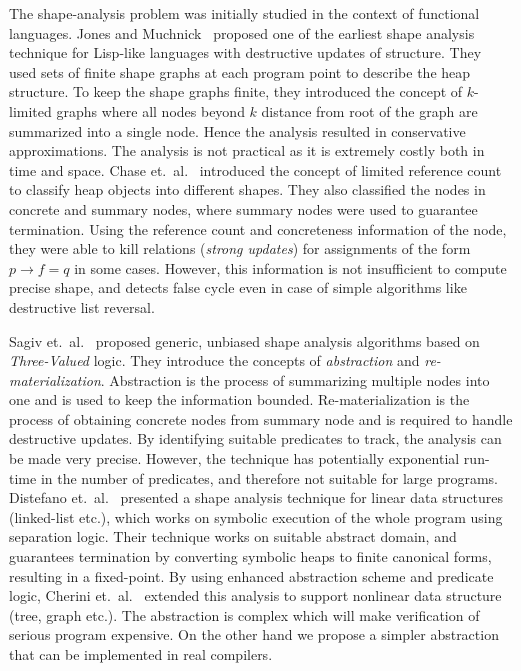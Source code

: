 \documentclass[letterpaper]{sig-alternate}
\newcommand{\p}{\ensuremath{p}}
\newcommand{\q}{\ensuremath{q}}
\begin{document}
The shape-analysis problem was initially studied in the
context of functional languages. Jones and
Muchnick~\cite{Jones79} proposed one of the earliest shape
analysis technique for Lisp-like languages with destructive
updates of structure. They used sets of finite shape graphs
at each program point to describe the heap structure. To
keep the shape graphs finite, they introduced the concept of
$k$-limited graphs where all nodes beyond $k$ distance from
root of the graph are summarized into a single node. Hence
the analysis resulted in conservative approximations. The
analysis is not practical as it is extremely costly both in
time and space.
%
Chase et.~al.~\cite{Chase90} introduced the concept of limited
reference count to classify heap objects into different
shapes. They also classified the nodes in concrete and
summary nodes, where summary nodes were used to guarantee
termination. Using the reference count and concreteness
information of the node, they were able to kill relations
({\em strong updates}) for assignments of the form $\p\rightarrow f = \q$
in some cases. However, this information is not
insufficient to compute precise shape, and detects false
cycle even in case of simple algorithms like destructive list
reversal.

Sagiv et.~al.~\cite{Sagiv96,Sagiv02toplas} proposed
generic, unbiased shape analysis algorithms based on {\em
  Three-Valued} logic. They introduce the concepts of {\em
  abstraction} and {\em re-materialization}. Abstraction is
the process of summarizing multiple nodes into one and is
used to keep the information bounded. Re-materialization is
the process of obtaining concrete nodes from summary node and
is required to handle destructive updates. By identifying
suitable predicates to track, the analysis can be made very
precise. However, the technique has potentially exponential
run-time in the number of predicates, and therefore not
suitable for large programs.
%
Distefano et.~al.~\cite{distefano06local} presented a shape
analysis technique for linear data structures (linked-list
etc.), which works on symbolic execution of the whole program
using separation logic. Their technique works on suitable
abstract domain, and guarantees termination by converting
symbolic heaps to finite canonical forms, resulting in a
fixed-point. By using enhanced abstraction scheme and
predicate logic, Cherini et.~al.~\cite{cherini10shape}
extended this analysis to support nonlinear data structure
(tree, graph etc.). The abstraction is complex which
  will make verification of serious program expensive.  On
  the other hand we propose a simpler abstraction that can be
  implemented in real compilers.
\end{document}
